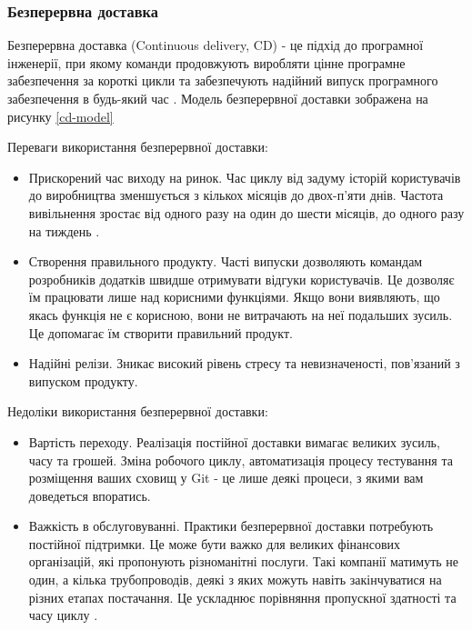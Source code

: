 \subsubsection{Безперервна доставка}

Безперервна доставка (Continuous delivery, CD) - це підхід до програмної інженерії,
при якому команди продовжують виробляти цінне програмне забезпечення
за короткі цикли та забезпечують надійний випуск програмного
забезпечення в будь-який час \cite{cd-chen}.
Модель безперервної доставки зображена на рисунку \ref{cd-model}


Переваги використання безперервної доставки:

\begin{itemize}
    \item Прискорений час виходу на ринок. Час циклу від задуму
      історій користувачів до виробництва зменшується з кількох місяців
      до двох-п'яти днів. Частота вивільнення зростає від 
      одного разу на один до шести місяців, до одного разу на тиждень \cite{cd-chen}.
    \item Створення правильного продукту. Часті випуски дозволяють
      командам розробників додатків швидше отримувати відгуки
      користувачів. Це дозволяє їм працювати лише над корисними функціями.
      Якщо вони виявляють, що якась функція не є корисною,
      вони не витрачають на неї подальших зусиль. Це допомагає їм створити правильний продукт.
    \item Надійні релізи. Зникає високий рівень стресу та невизначеності,
      пов'язаний з випуском продукту. 
\end{itemize}

Недоліки використання безперервної доставки:

\begin{itemize}
    \item Вартість переходу. Реалізація постійної доставки вимагає
      великих зусиль, часу та грошей. Зміна робочого циклу,
      автоматизація процесу тестування та розміщення ваших
      сховищ у Git - це лише деякі процеси, з якими вам доведеться впоратись.
    \item Важкість в обслуговуванні.  Практики безперервної доставки потребують
      постійної підтримки. Це може бути важко для великих фінансових організацій,
      які пропонують різноманітні послуги. Такі компанії матимуть не один,
      а кілька трубопроводів, деякі з яких можуть навіть закінчуватися
      на різних етапах постачання. Це ускладнює порівняння
      пропускної здатності та часу циклу \cite{cd-article}.
\end{itemize}


